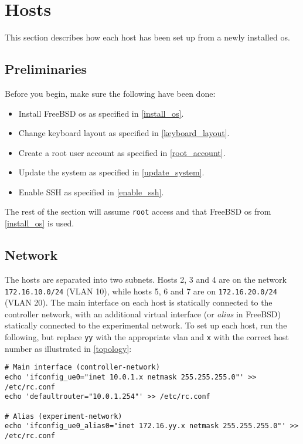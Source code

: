 \chapter{Hosts}

This section describes how each host has been set up from a newly installed \gls{os}.

\section{Preliminaries}

Before you begin, make sure the following have been done:

\begin{itemize}
    \item Install FreeBSD \gls{os} as specified in \ref{install_os}.
    \item Change keyboard layout as specified in \ref{keyboard_layout}.
    \item Create a root user account as specified in \ref{root_account}.
    \item Update the system as specified in \ref{update_system}.
    \item Enable SSH as specified in \ref{enable_ssh}.
\end{itemize}

The rest of the section will assume \lstinline{root} access and that FreeBSD \gls{os} from \ref{install_os} is used.


\section{Network}

The hosts are separated into two subnets. Hosts 2, 3 and 4 are on the network \lstinline{172.16.10.0/24} (VLAN 10), while hosts 5, 6 and 7 are on \lstinline{172.16.20.0/24} (VLAN 20). The main interface on each host is statically connected to the controller network, with an additional virtual interface (or \textit{alias} in FreeBSD) statically connected to the experimental network. To set up each host, run the following, but replace \lstinline{yy} with the appropriate \gls{vlan} and \lstinline{x} with the correct host number as illustrated in \ref{topology}:

\begin{verbatim}
# Main interface (controller-network)
echo 'ifconfig_ue0="inet 10.0.1.x netmask 255.255.255.0"' >> /etc/rc.conf
echo 'defaultrouter="10.0.1.254"' >> /etc/rc.conf

# Alias (experiment-network)
echo 'ifconfig_ue0_alias0="inet 172.16.yy.x netmask 255.255.255.0"' >> /etc/rc.conf
\end{verbatim}

